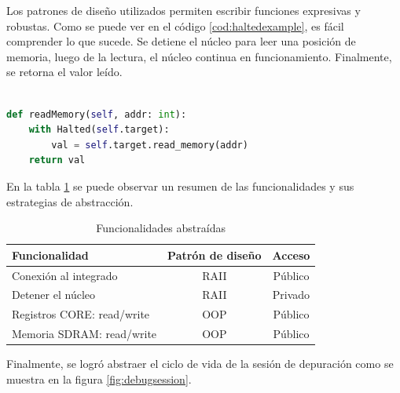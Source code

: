 Los patrones de diseño utilizados permiten escribir funciones expresivas y robustas.
Como se puede ver en el código \ref{cod:haltedexample}, es fácil comprender lo que sucede.
Se detiene el núcleo para leer una posición de memoria, luego de la lectura, el núcleo continua en funcionamiento.
Finalmente, se retorna el valor leído.

\newpage

\begin{lstlisting}[language=Python,label=cod:haltedexample,caption=Ejemplo de uso de \emph{RAII}.]  % Start your code-block

def readMemory(self, addr: int):
    with Halted(self.target):
        val = self.target.read_memory(addr)
    return val

\end{lstlisting}

En la tabla \ref{tab:funcionalidades} se puede observar un resumen de las funcionalidades y sus estrategias de abstracción.

\begin{table}[h]
	\centering
	\caption[Funcionalidades abstraidas]{Funcionalidades abstraídas}

	\begin{tabular}{l c c}    
		\toprule
        \textbf{Funcionalidad}     & \textbf{Patrón de diseño} & \textbf{Acceso}\\
		\midrule
		Conexión al integrado      & RAII                      & Público\\		
		Detener el núcleo          & RAII                      & Privado\\
		Registros CORE: read/write & OOP                       & Público\\
		Memoria SDRAM: read/write  & OOP                       & Público\\
		\bottomrule
		\hline
	\end{tabular}
	\label{tab:funcionalidades}
\end{table}

Finalmente, se logró abstraer el ciclo de vida de la sesión de depuración como se muestra en la figura \ref{fig:debugsession}.

